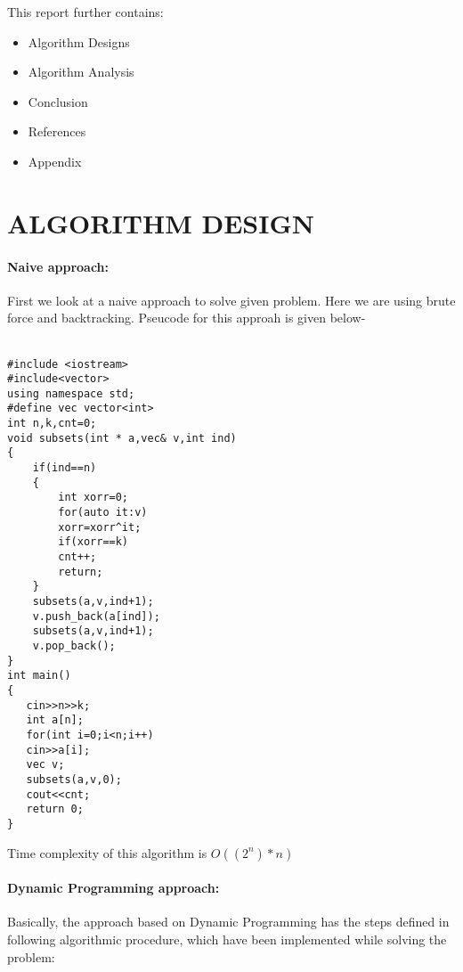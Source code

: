 \documentclass[10pt]{article}
\begin{document}
\begin{multicols*}{2}
This report further contains:
\begin{itemize}
\item 	Algorithm  Designs
\item 	Algorithm  Analysis
\item 	Conclusion
\item 	References
\item 	Appendix
\end{itemize}

\section*{ALGORITHM DESIGN}

\paragraph{Naive approach:}
First we look at a naive approach to solve given problem. Here we are using brute force and backtracking. Pseucode for this approah is given below-\\\\

\begin{lstlisting}
#include <iostream>
#include<vector>
using namespace std;
#define vec vector<int>
int n,k,cnt=0;
void subsets(int * a,vec& v,int ind)
{
    if(ind==n)
    {
        int xorr=0;
        for(auto it:v)
        xorr=xorr^it;
        if(xorr==k)
        cnt++;
        return;
    }
    subsets(a,v,ind+1);
    v.push_back(a[ind]);
    subsets(a,v,ind+1);
    v.pop_back();
}
int main()
{
   cin>>n>>k;
   int a[n];
   for(int i=0;i<n;i++)
   cin>>a[i];
   vec v;
   subsets(a,v,0);
   cout<<cnt;
   return 0;
}

\end{lstlisting}


Time complexity of this algorithm is \(O((2^n )* n)\)


\paragraph{Dynamic Programming approach:}

Basically, the approach based on Dynamic Programming has the steps defined in following algorithmic procedure, which have been implemented while solving the problem:
\begin{enumerate}


\end{enumerate}
\end{multicols*}
\end{document}
